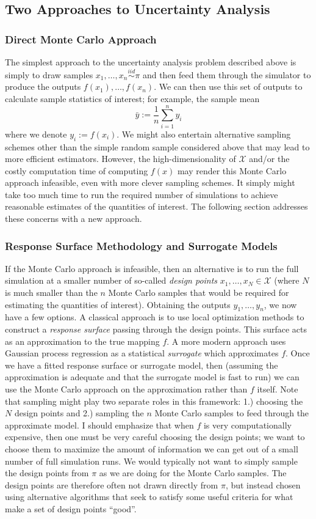 \documentclass[12pt]{article}
\begin{document}
\subsection{Two Approaches to Uncertainty Analysis}
\subsubsection{Direct Monte Carlo Approach}
The simplest approach to the uncertainty analysis problem described above 
is simply to draw samples $x_1, \dots, x_n \overset{iid}{\sim} \pi$ and then feed them through the simulator to produce the outputs 
$f(x_1), \dots, f(x_n)$. We can then use this set of outputs to calculate sample statistics of interest; for example, the sample mean
\[\bar{y} := \frac{1}{n} \sum_{i = 1}^{n} y_i\]
where we denote $y_i := f(x_i)$. 
We might also entertain alternative sampling schemes other than the simple random sample considered above that may lead to more efficient estimators. 
However, the high-dimensionality of $\mathcal{X}$ and/or the costly computation time of computing $f(x)$ may render this Monte Carlo approach infeasible, 
even with more clever sampling schemes. It simply might take too much time to run the required number of simulations to achieve reasonable estimates of 
the quantities of interest. The following section addresses these concerns with a new approach. 

\subsubsection{Response Surface Methodology and Surrogate Models}
If the Monte Carlo approach is infeasible, then an alternative is to run the full simulation at a smaller number of so-called \textit{design points}
$x_1, \dots, x_N \in \mathcal{X}$ (where $N$ is much smaller than the $n$ Monte Carlo samples that would be required for estimating the 
quantities of interest). Obtaining the outputs $y_1, \dots, y_n$, we now have a few options. A classical approach is to use local optimization 
methods to construct a \textit{response surface} passing through the design points. This surface acts as an approximation to the true mapping $f$. 
A more modern approach uses Gaussian process regression as a statistical \textit{surrogate} which approximates $f$. Once we have a fitted 
response surface or surrogate model, then (assuming the approximation is adequate and that the surrogate model is fast to run) 
we can use the Monte Carlo approach on the approximation rather than $f$ itself. Note that sampling might play two separate roles in this framework: 
1.) choosing the $N$ design points and 2.) sampling the $n$ Monte Carlo samples to feed through the approximate model. I should emphasize that when 
$f$ is very computationally expensive, then one must be very careful choosing the design points; we want to choose them to maximize the amount of 
information we can get out of a small number of full simulation runs. We would typically not want to simply sample the design points from $\pi$ as we 
are doing for the Monte Carlo samples. The design points are therefore often not drawn directly from $\pi$, but instead chosen using alternative algorithms
that seek to satisfy some useful criteria for what make a set of design points ``good''. 
\end{document}
